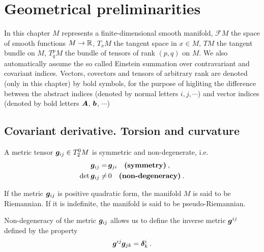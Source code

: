 \chapter{Geometrical preliminarities}

In this chapter $M$ represents a finite-dimensional smooth manifold, $\mathcal F M$ the space of smooth functions $M \to \mathbb{R}$, $T_x M$ the tangent space in $x \in M$, $T M$ the tangent bundle on $M$, $T^p_q M$ the bundle of tensors of rank $(p,q)$ on $M$. We also automatically assume the so called Einstein summation over contravariant and covariant indices. Vectors, covectors and tensors of arbitrary rank are denoted (only in this chapter) by bold symbols, for the purpose of higliting the difference between the abstract indices (denoted by normal letters $i,j,\cdots$) and vector indices (denoted by bold letters $\boldsymbol{A}$, $\boldsymbol{b}$, $\cdots$)

\section{Covariant derivative. Torsion and curvature}

\begin{definition}
    A metric tensor $\boldsymbol{g}_{ij} \in T^0_2 M$ is symmetric and non-degenerate, i.e.
    \begin{align}
        \boldsymbol{g}_{ij} =&\, \boldsymbol{g}_{ji} \quad \textbf{(symmetry)}\:, \\ \det \boldsymbol{g}_{ij} \neq&\, 0 \quad \textbf{(non-degeneracy)}\:.
    \end{align}
\end{definition}

If the metric $\boldsymbol{g}_{ij}$ is positive quadratic form, the manifold $M$ is said to be Riemannian. If it is indefinite, the manifold is said to be pseudo-Riemannian.

Non-degeneracy of the metric $\boldsymbol{g}_{ij}$ allows us to define the inverse metric $\boldsymbol{g}^{ij}$ defined by the property
\begin{align}
    \boldsymbol{g}^{ij} \boldsymbol{g}_{jk} = \boldsymbol{\delta}^i_k \:.
\end{align}

